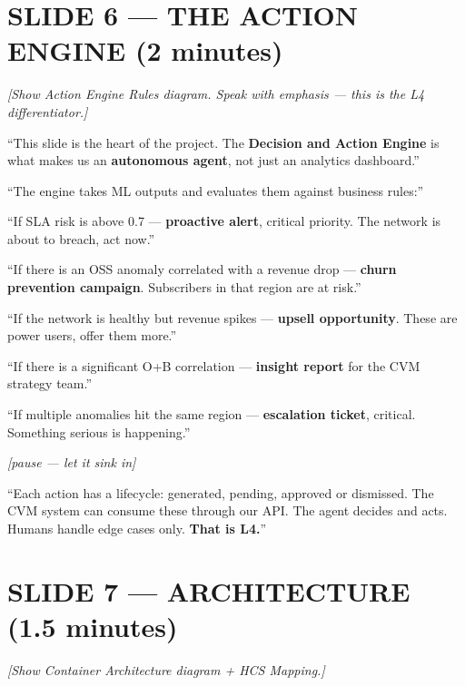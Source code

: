 \documentclass[12pt,a4paper]{article}
\newcommand{\stage}[1]{\par\textit{\color{stagedir}[#1]}\par}
\newcommand{\beat}{\par\vspace{0.4em}}
\newcommand{\pause}{\par\textit{\color{stagedir}[pause --- let it sink
            in]}\par}
\newcommand{\keyword}[1]{\textbf{\color{aiviolet}#1}}
\newcommand{\emphasis}[1]{\textbf{\color{huaweired}#1}}
\begin{document}
\section{SLIDE 6 --- THE ACTION ENGINE (2 minutes)}

\stage{Show Action Engine Rules diagram. Speak with emphasis --- this is the L4
    differentiator.}

``This slide is the heart of the project. The \keyword{Decision and Action
    Engine} is what makes us an \emphasis{autonomous agent}, not just an analytics
dashboard.''

\beat

``The engine takes ML outputs and evaluates them against business rules:''

\beat

``If SLA risk is above 0.7 --- \emphasis{proactive alert}, critical priority.
The network is about to breach, act now.''

\beat

``If there is an OSS anomaly correlated with a revenue drop --- \emphasis{churn
    prevention campaign}. Subscribers in that region are at risk.''

\beat

``If the network is healthy but revenue spikes --- \emphasis{upsell
    opportunity}. These are power users, offer them more.''

\beat

``If there is a significant O+B correlation --- \emphasis{insight report} for
the CVM strategy team.''

\beat

``If multiple anomalies hit the same region --- \emphasis{escalation ticket},
critical. Something serious is happening.''

\pause

``Each action has a lifecycle: generated, pending, approved or dismissed. The
CVM system can consume these through our API. The agent decides and acts.
Humans handle edge cases only. \emphasis{That is L4.}''

\newpage
\section{SLIDE 7 --- ARCHITECTURE (1.5 minutes)}

\stage{Show Container Architecture diagram + HCS Mapping.}
\end{document}
